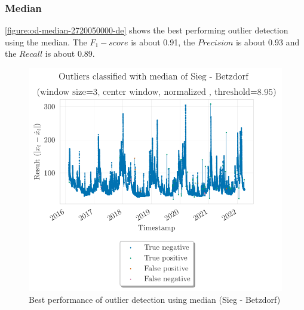 \subsubsection{Median}
\autoref{figure:od-median-2720050000-de} shows the best performing outlier detection using the median. The $F_1-score$ is about 0.91, the $Precision$ is about 0.93 and the $Recall$ is about 0.89.
\begin{figure}[htp]
    \centering 
    \includegraphics{plots/pdfs/2720050000-de/od_median_2720050000-de_all.pdf}
    \caption{Best performance of outlier detection using median (Sieg - Betzdorf)}
    \label{figure:od-median-2720050000-de}
\end{figure}

